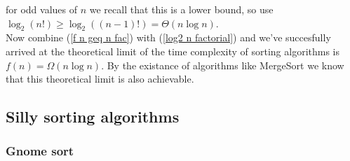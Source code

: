 for odd values of $n$ we recall that this is a lower bound, so use $\log_2(n!)\geq \log_2((n-1)!)=\Theta(n\log n)$.
\\
Now combine (\ref{f n geq n fac}) with (\ref{log2 n factorial}) and 
we've succesfully arrived at the theoretical limit of the time complexity 
of sorting algorithms is $f(n)=\Omega(n\log n)$. By the existance of algorithms like MergeSort
we know that this theoretical limit is also achievable.

\subsection{Silly sorting algorithms}
\subsubsection{Gnome sort}
